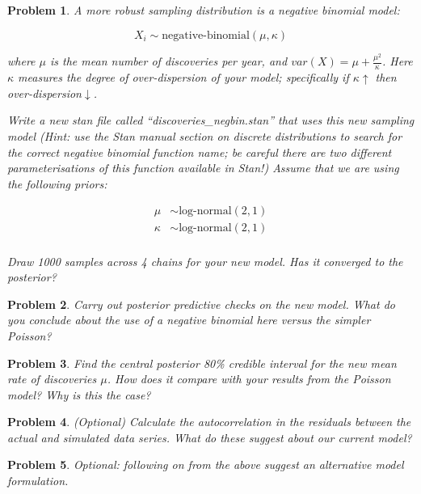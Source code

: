 \documentclass{article}
\newtheorem{problem}{Problem}[section]
\begin{document}
\begin{problem}
A more robust sampling distribution is a negative binomial model:

\begin{equation}
X_i \sim \text{negative-binomial}(\mu,\kappa)
\end{equation}

where $\mu$ is the mean number of discoveries per year, and $var(X) = \mu + \frac{\mu^2}{\kappa}$. Here $\kappa$ measures the degree of over-dispersion of your model; specifically if $\kappa\uparrow$ then over-dispersion$\downarrow$.  

Write a new stan file called ``discoveries\_negbin.stan'' that uses this new sampling model (Hint: use the Stan manual section on discrete distributions to search for the correct negative binomial function name; be careful there are two different parameterisations of this function available in Stan!) Assume that we are using the following priors:

\begin{align}
\mu&\sim \text{log-normal}(2,1)\\
\kappa&\sim \text{log-normal}(2,1)\\
\end{align}
	
Draw 1000 samples across 4 chains for your new model. Has it converged to the posterior? 
\end{problem}

\begin{problem}
Carry out posterior predictive checks on the new model. What do you conclude about the use of a negative binomial here versus the simpler Poisson?
\end{problem}

\begin{problem}
Find the central posterior 80\% credible interval for the new mean rate of discoveries $\mu$. How does it compare with your results from the Poisson model? Why is this the case?
\end{problem}

\begin{problem}
(Optional) Calculate the autocorrelation in the residuals between the actual and simulated data series. What do these suggest about our current model?
\end{problem}

\begin{problem}
Optional: following on from the above suggest an alternative model formulation.
\end{problem}
\end{document}
